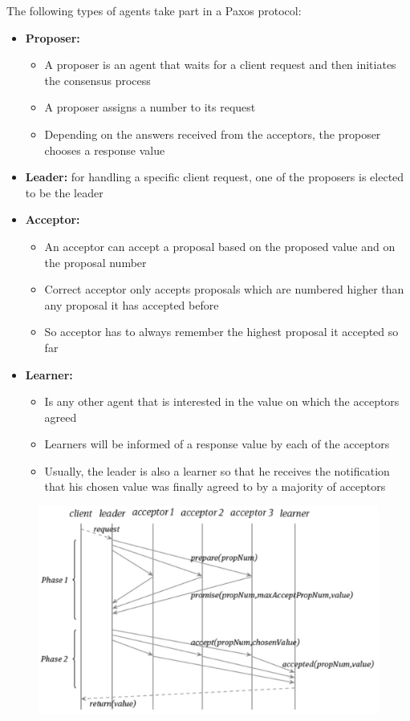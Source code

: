 The following types of agents take part in a Paxos protocol:
\begin{itemize}
    \item \textbf{Proposer:} 
    \begin{itemize}
        \item A proposer is an agent that waits for a client request and then initiates the consensus process
        \item A proposer assigns a number to its request
        \item Depending on the answers received from the acceptors, the proposer chooses a response value
    \end{itemize}
    \item \textbf{Leader:} for handling a specific client request, one of the proposers is elected to be the leader
    \item \textbf{Acceptor:} 
    \begin{itemize}
        \item An acceptor can accept a proposal based on the proposed value and on the proposal number
        \item Correct acceptor only accepts proposals which are numbered higher than any proposal it has accepted before
        \item So acceptor has to always remember the highest proposal it accepted so far
    \end{itemize}
    \item \textbf{Learner:}
    \begin{itemize}
        \item Is any other agent that is interested in the value on which the acceptors agreed
        \item Learners will be informed of a response value by each of the acceptors
        \item Usually, the leader is also a learner so that he receives the notification that his chosen value was finally agreed to by a majority of acceptors
    \end{itemize}
\end{itemize}

\begin{figure}[h!]
\centering
\includegraphics[width=.7\linewidth]{images/AdvancedDataManagment/distribute_concurrency_control/pasox.jpeg}
\end{figure}

